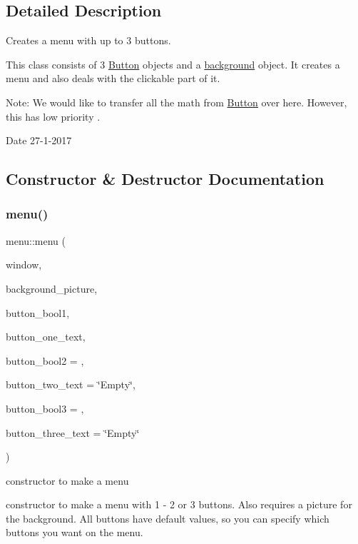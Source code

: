 \subsection{Detailed Description}
Creates a menu with up to 3 buttons. 

This class consists of 3 \hyperlink{class_button}{Button} objects and a \hyperlink{classbackground}{background} object. It creates a menu and also deals with the clickable part of it.

Note\+: We would like to transfer all the math from \hyperlink{class_button}{Button} over here. However, this has low priority .

\begin{DoxyDate}{Date}
27-\/1-\/2017 
\end{DoxyDate}


\subsection{Constructor \& Destructor Documentation}
\mbox{\label{classmenu_a1c6f1319ba2123f9654df695725e83b4}} 
\subsubsection{\texorpdfstring{menu()}{menu()}}
{\footnotesize\ttfamily menu\+::menu (\begin{DoxyParamCaption}\item[{sf\+::\+Render\+Window \&}]{window,  }\item[{std\+::string}]{background\+\_\+picture,  }\item[{bool}]{button\+\_\+bool1,  }\item[{std\+::string}]{button\+\_\+one\+\_\+text,  }\item[{bool}]{button\+\_\+bool2 = {},  }\item[{std\+::string}]{button\+\_\+two\+\_\+text = {\ttfamily \char`\"{}Empty\char`\"{}},  }\item[{bool}]{button\+\_\+bool3 = {},  }\item[{std\+::string}]{button\+\_\+three\+\_\+text = {\ttfamily \char`\"{}Empty\char`\"{}} }\end{DoxyParamCaption})}



constructor to make a menu 

constructor to make a menu with 1 -\/ 2 or 3 buttons. Also requires a picture for the background. All buttons have default values, so you can specify which buttons you want on the menu.


